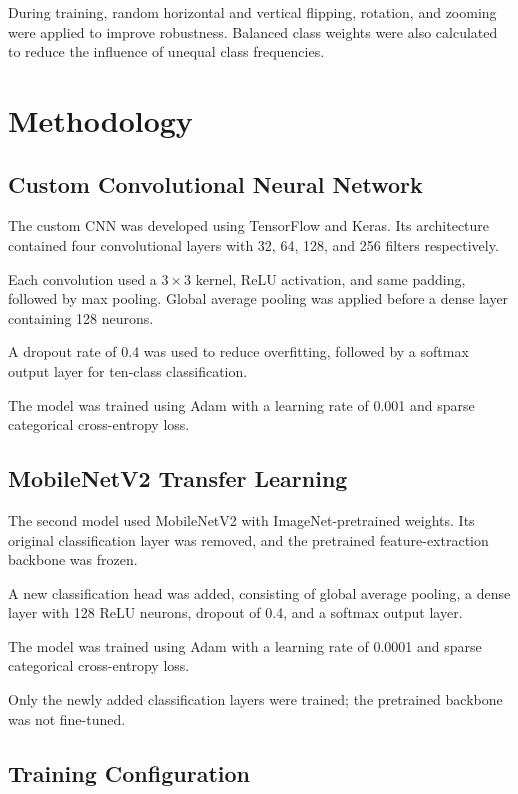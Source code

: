 \documentclass[12pt,a4paper]{article}
\begin{document}
During training, random horizontal and vertical flipping, rotation, and zooming were applied to improve robustness. Balanced class weights were also calculated to reduce the influence of unequal class frequencies.

\section{Methodology}

\subsection{Custom Convolutional Neural Network}

The custom CNN was developed using TensorFlow and Keras. Its architecture contained four convolutional layers with 32, 64, 128, and 256 filters respectively.

Each convolution used a $3 \times 3$ kernel, ReLU activation, and same padding, followed by max pooling. Global average pooling was applied before a dense layer containing 128 neurons.

A dropout rate of 0.4 was used to reduce overfitting, followed by a softmax output layer for ten-class classification.

The model was trained using Adam with a learning rate of 0.001 and sparse categorical cross-entropy loss.

\subsection{MobileNetV2 Transfer Learning}

The second model used MobileNetV2 with ImageNet-pretrained weights. Its original classification layer was removed, and the pretrained feature-extraction backbone was frozen.

A new classification head was added, consisting of global average pooling, a dense layer with 128 ReLU neurons, dropout of 0.4, and a softmax output layer.

The model was trained using Adam with a learning rate of 0.0001 and sparse categorical cross-entropy loss.

Only the newly added classification layers were trained; the pretrained backbone was not fine-tuned.

\subsection{Training Configuration}
\end{document}
